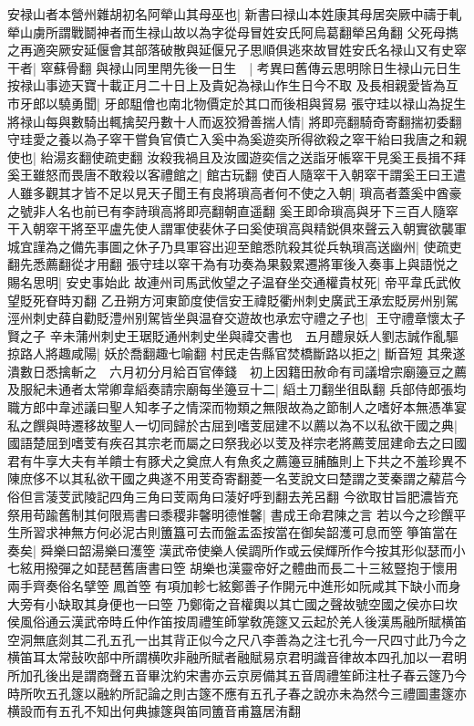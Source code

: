 安禄山者本營州雜胡初名阿犖山其母巫也|{
	新書曰禄山本姓康其母居突厥中禱于軋犖山虜所謂戰鬬神者而生禄山故以為字從母冒姓安氏阿烏葛翻犖呂角翻}
父死母擕之再適突厥安延偃會其部落破散與延偃兄子思順俱逃來故冒姓安氏名禄山又有史窣干者|{
	窣蘇骨翻}
與禄山同里閈先後一日生　|{
	考異曰舊傳云思明除日生禄山元日生按禄山事迹天寶十載正月二十日上及貴妃為禄山作生日今不取}
及長相親愛皆為互市牙郎以驍勇聞|{
	牙郎駔儈也南北物價定於其口而後相與貿易}
張守珪以禄山為捉生將禄山每與數騎出輒擒契丹數十人而返狡猾善揣人情|{
	將即亮翻騎奇寄翻揣初委翻}
守珪愛之養以為子窣干嘗負官債亡入奚中為奚遊奕所得欲殺之窣干紿曰我唐之和親使也|{
	紿湯亥翻使疏吏翻}
汝殺我禍且及汝國遊奕信之送詣牙帳窣干見奚王長揖不拜奚王雖怒而畏唐不敢殺以客禮館之|{
	館古玩翻}
使百人隨窣干入朝窣干謂奚王曰王遣人雖多觀其才皆不足以見天子聞王有良將瑣高者何不使之入朝|{
	瑣高者蓋奚中酋豪之號非人名也前已有李詩瑣高將即亮翻朝直遥翻}
奚王即命瑣高與牙下三百人隨窣干入朝窣干將至平盧先使人謂軍使裴休子曰奚使瑣高與精鋭俱來聲云入朝實欲襲軍城宜謹為之備先事圖之休子乃具軍容出迎至館悉阬殺其從兵執瑣高送幽州|{
	使疏吏翻先悉薦翻從才用翻}
張守珪以窣干為有功奏為果毅累遷將軍後入奏事上與語悦之賜名思明|{
	安史事始此}
故連州司馬武攸望之子温眘坐交通權貴杖死|{
	帝平韋氏武攸望貶死眘時刃翻}
乙丑朔方河東節度使信安王禕貶衢州刺史廣武王承宏貶房州别駕涇州刺史薛自勸貶澧州别駕皆坐與温眘交遊故也承宏守禮之子也|{
	王守禮章懷太子賢之子}
辛未蒲州刺史王琚貶通州刺史坐與禕交書也　五月醴泉妖人劉志誠作亂驅掠路人將趣咸陽|{
	妖於喬翻趣七喻翻}
村民走告縣官焚橋斷路以拒之|{
	斷音短}
其衆遂潰數日悉擒斬之　六月初分月給百官俸錢　初上因籍田赦命有司議增宗廟籩豆之薦及服紀未通者太常卿韋縚奏請宗廟每坐籩豆十二|{
	縚土刀翻坐徂臥翻}
兵部侍郎張均職方郎中韋述議曰聖人知孝子之情深而物類之無限故為之節制人之嗜好本無憑凖宴私之饌與時遷移故聖人一切同歸於古屈到嗜芰屈建不以薦以為不以私欲干國之典|{
	國語楚屈到嗜芰有疾召其宗老而屬之曰祭我必以芰及祥宗老將薦芰屈建命去之曰國君有牛享大夫有羊饋士有豚犬之奠庶人有魚炙之薦籩豆脯醢則上下共之不羞珍異不陳庶侈不以其私欲干國之典遂不用芰奇寄翻菱一名芰說文曰楚謂之芰秦謂之薢茩今俗但言蓤芰武陵記四角三角曰芰兩角曰蓤好呼到翻去羌呂翻}
今欲取甘旨肥濃皆充祭用苟踰舊制其何限焉書曰黍稷非馨明德惟馨|{
	書成王命君陳之言}
若以今之珍饌平生所習求神無方何必泥古則簠簋可去而盤盂盃按當在御矣韶濩可息而箜箏笛當在奏矣|{
	舜樂曰韶湯樂曰濩箜漢武帝使樂人侯調所作或云侯輝所作今按其形似瑟而小七絃用撥彈之如琵琶舊唐書曰箜胡樂也漢靈帝好之體曲而長二十三絃豎抱于懷用兩手齊奏俗名擘箜鳳首箜有項加軫七絃鄭善子作開元中進形如阮咸其下缺小而身大旁有小缺取其身便也一曰箜乃鄭衛之音權輿以其亡國之聲故號空國之侯亦曰坎侯風俗通云漢武帝時丘仲作笛按周禮笙師掌敎箎篴又云起於羌人後漢馬融所賦横笛空洞無底剡其二孔五孔一出其背正似今之尺八李善為之注七孔今一尺四寸此乃今之横笛耳太常鼔吹部中所謂横吹非融所賦者融賦易京君明識音律故本四孔加以一君明所加孔後出是謂商聲五音畢沈約宋書亦云京房備其五音周禮笙師注杜子春云篴乃今時所吹五孔篴以融約所記論之則古篴不應有五孔子春之說亦未為然今三禮圖畫篴亦横設而有五孔不知出何典據篴與笛同簠音甫簋居洧翻}
